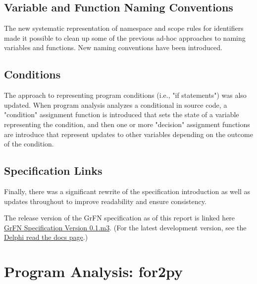 \documentclass[article, 12pt, oneside]{memoir}
\begin{document}
\hypertarget{variable-and-function-naming-conventions}{%
\subsection{Variable and Function Naming
Conventions}\label{variable-and-function-naming-conventions}}

The new systematic representation of namespace and scope rules for
identifiers made it possible to clean up some of the previous ad-hoc
approaches to naming variables and functions. New naming conventions
have been introduced.

\hypertarget{conditions}{%
\subsection{Conditions}\label{conditions}}

The approach to representing program conditions (i.e., "if statements")
was also updated. When program analysis analyzes a conditional in source
code, a "condition" assignment function is introduced that sets the
state of a variable representing the condition, and then one or more
"decision" assignment functions are introduce that represent updates to
other variables depending on the outcome of the condition.

\hypertarget{specification-links}{%
\subsection{Specification Links}\label{specification-links}}

Finally, there was a significant rewrite of the specification
introduction as well as updates throughout to improve readability and
ensure consistency.

The release version of the GrFN specification as of this report is
linked here \href{GrFN_specification_v0.1.m3}{GrFN Specification Version
0.1.m3}. (For the latest development version, see the
\href{https://delphi.readthedocs.io/en/master/grfn_spec.html}{Delphi
read the docs page}.)


\hypertarget{program-analysis-for2py}{%
\section{Program Analysis: for2py}\label{program-analysis-for2py}}
\end{document}
